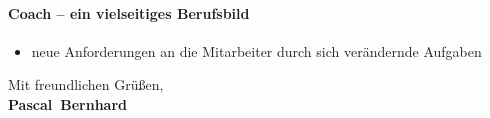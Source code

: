 \documentclass[11pt,a4paper]{article}
\def\firstname{Pascal}
\def\familyname{Bernhard}
\begin{document}
\paragraph*{\textsf{Coach -- ein vielseitiges Berufsbild}}

\begin{itemize}
\item neue Anforderungen an die Mitarbeiter durch sich verändernde Aufgaben
\end{itemize}



  
Mit freundlichen Grüßen,\\[2em] %
%
{\bfseries \firstname~\familyname}\\
%
\end{document}
